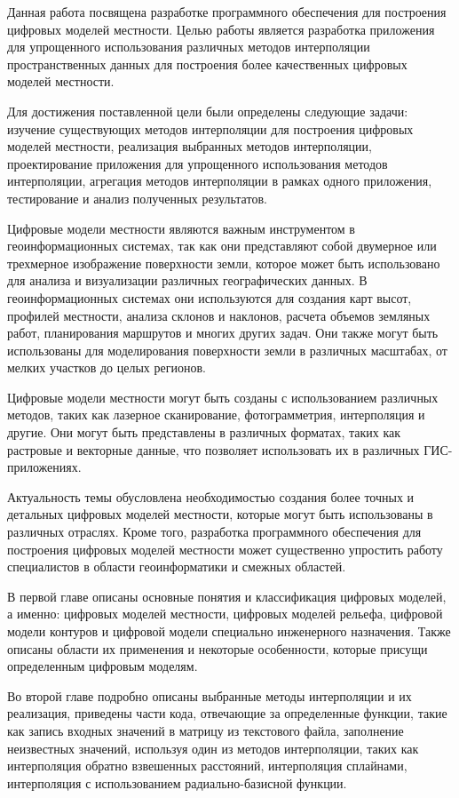 \intro
Данная работа посвящена разработке программного обеспечения для построения цифровых моделей местности. Целью работы является разработка приложения для упрощенного использования различных методов интерполяции пространственных данных для построения более качественных цифровых моделей местности. 

Для достижения поставленной цели были определены следующие задачи: изучение существующих методов интерполяции для построения цифровых моделей местности, реализация выбранных методов интерполяции, проектирование приложения для упрощенного использования методов интерполяции, агрегация методов интерполяции в рамках одного приложения, тестирование и анализ полученных результатов.

Цифровые модели местности являются важным инструментом в геоинформационных системах, так как они представляют собой двумерное или трехмерное изображение поверхности земли, которое может быть использовано для анализа и визуализации различных географических данных. В геоинформационных системах они используются для создания карт высот, профилей местности, анализа склонов и наклонов, расчета объемов земляных работ, планирования маршрутов и многих других задач. Они также могут быть использованы для моделирования поверхности земли в различных масштабах, от мелких участков до целых регионов. 

Цифровые модели местности могут быть созданы с использованием различных методов, таких как лазерное сканирование, фотограмметрия, интерполяция и другие. Они могут быть представлены в различных форматах, таких как растровые и векторные данные, что позволяет использовать их в различных ГИС-приложениях.

Актуальность темы обусловлена необходимостью создания более точных и детальных цифровых моделей местности, которые могут быть использованы в различных отраслях. Кроме того, разработка программного обеспечения для построения цифровых моделей местности может существенно упростить работу специалистов в области геоинформатики и смежных областей.

В первой главе описаны основные понятия и классификация цифровых моделей, а именно: цифровых моделей местности, цифровых моделей рельефа, цифровой модели контуров и цифровой модели специально инженерного назначения. Также описаны области их применения и некоторые особенности, которые присущи определенным цифровым моделям.

Во второй главе подробно описаны выбранные методы интерполяции и их реализация, приведены части кода, отвечающие за определенные функции, такие как запись входных значений в матрицу из текстового файла, заполнение неизвестных значений, используя один из методов интерполяции, таких как интерполяция обратно взвешенных расстояний, интерполяция сплайнами, интерполяция с использованием радиально-базисной функции.

